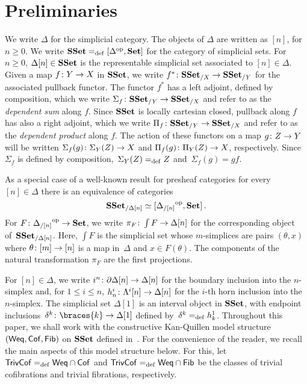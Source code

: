 \documentclass[reqno,10pt,a4paper,oneside,draft]{amsart}
\begin{document}
\section{Preliminaries} 
\label{sec:preliminaries}




We write $\Delta$ for the simplicial category. The objects of $\Delta$ are written as $[n]$, for $n \geq 0$.
We write $\mathbf{SSet} =_{\operatorname{def}} [\Delta^{\operatorname{op}}, \mathbf{Set}]$ for the category of simplicial sets. For $n \geq 0$, $\Delta[n] \in \mathbf{SSet}$ is the representable simplicial set associated to $[n] \in \Delta$. Given a map $f \colon Y \to X$ in $\mathbf{SSet}$, we write $f^* \colon \mathbf{SSet}_{/X} \to \mathbf{SSet}_{/Y}$
for the associated pullback functor. The functor $f^*$ has a left adjoint, defined
by composition, which we write $\Sigma_{f} \colon \mathbf{SSet}_{/Y} \to \mathbf{SSet}_{/X}$ and refer
to as the \emph{dependent sum} along $f$. Since $\mathbf{SSet}$ is locally cartesian closed, pullback
along $f$ has also a right adjoint, which we write 
$\Pi_f \colon \mathbf{SSet}_{/Y} \to \mathbf{SSet}_{/X}$ and refer to as the \emph{dependent
product}  along $f$. The action of these functors on a
map $g \colon Z \to Y$ will be written $\Sigma_f(g) \colon \Sigma_Y(Z) \to X$ and 
$\Pi_f(g) \colon \Pi_Y(Z) \to X$, respectively. Since  $\Sigma_f$ is defined by composition,~$\Sigma_Y(Z) =_{\operatorname{def}} Z$ and~$\Sigma_f(g) = g f $. 

As a special case of a well-known result for presheaf 
categories for every~$[n] \in \Delta$ there is an equivalence of categories
\begin{equation}
\label{equ:psh-slice-sset}
\mathbf{SSet}_{/\Delta[n]} \simeq  [ {\Delta_{/[n]}}^{\operatorname{op}}, \mathbf{Set}]   \, .
\end{equation}
For $F \colon {\Delta_{/[n]}}^{\operatorname{op}} \to \mathbf{Set}$, we write $\pi_F \colon \int F \to \Delta[n]$
for the corresponding object of~$\mathbf{SSet}_{/ \Delta[n]}$. Here, $\int F$ is the
simplicial set whose $m$-simplices are pairs $(\theta, x)$ where $\theta \colon [m] \to [n]$
is a map in~$\Delta$ and $x \in F(\theta)$. The components of the natural
transformation $\pi_F$ are the first projections.




For $[n] \in \Delta$, we write $i^n \colon  \partial \Delta[n] \to \Delta[n]$ for the boundary inclusion into the $n$-simplex and, for $1 \leq i \leq n$,  
$h^i_n  \colon \Lambda^i[n] \to \Delta[n]$  for the $i$-th horn inclusion into the $n$-simplex. The simplicial set $\Delta[1]$ is an interval object in $\mathbf{SSet}$, with endpoint inclusions~$\kcyl \co \braces{ k} \to \Delta[1]$ defined by~$\delta^k =_{\operatorname{def}} h^1_k$. Throughout this paper, we shall work  with the constructive 
Kan-Quillen model structure $(\mathsf{Weq}, \mathsf{Cof}, \mathsf{Fib})$ on $\mathbf{SSet}$ defined in~\cite{henry2019qms}. 
For the convenience of the reader, we recall the main aspects of this model structure below.
For this, let $\mathsf{TrivCof} =_{\operatorname{def}} \mathsf{Weq} \cap \mathsf{Cof}$ and $\mathsf{TrivCof} =_{\operatorname{def}} \mathsf{Weq} \cap \mathsf{Fib}$ be the classes of trivial cofibrations and trivial fibrations,
respectively. 
\end{document}

